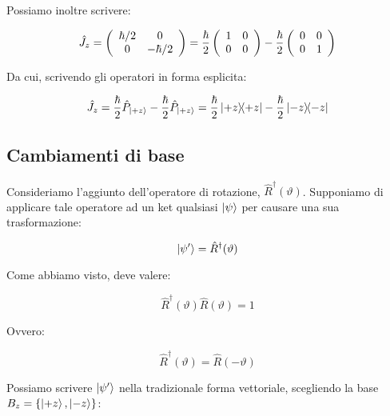 Possiamo inoltre scrivere:

	\begin{equation}
		\hat{J}_z = 
		\left( \begin{array}{c c}
				\hbar / 2 & 0 \\
				0 &  - \hbar / 2 \\ 
			\end{array}
		\right ) =
		\frac{\hbar}{2}
		\left( \begin{array}{c c}
				1 & 0 \\
				0 & 0 \\ 
			\end{array}
		\right ) -
		\frac{\hbar}{2}
		\left( \begin{array}{c c}
				0 & 0 \\
				0 & 1 \\ 
			\end{array}
		\right )
	\end{equation}

Da cui, scrivendo gli operatori in forma esplicita:

	\begin{equation}
		\hat{J}_z = \frac{\hbar}{2} \hat{P}_{\ket{+z}} - \frac{\hbar}{2} \hat{P}_{\ket{+z}} = \frac{\hbar}{2} \ketbra{+z}{+z} - \frac{\hbar}{2} \ketbra{-z}{-z}
	\end{equation}

\subsection{Cambiamenti di base}

	Consideriamo l'aggiunto dell'operatore di rotazione, $\hat{R}^\dagger(\vartheta)$. Supponiamo di applicare tale operatore ad un ket qualsiasi $\ket{\psi}$ per causare una sua trasformazione:

	\[
		\ket{\psi'} = \hat{R}^\dagger(\vartheta)
	\]

Come abbiamo visto, deve valere:

	\begin{equation} \label{eq:rotationAdjoint}
		\hat{R}^\dagger(\vartheta) \hat{R}(\vartheta) = 1
	\end{equation}

Ovvero:

	\begin{equation}
		\hat{R}^\dagger(\vartheta) = \hat{R} ( -\vartheta )
	\end{equation}

Possiamo scrivere $\ket{\psi'}$ nella tradizionale forma vettoriale, scegliendo la base $B_z = \{ \ket{+z}, \ket{-z} \} $:

